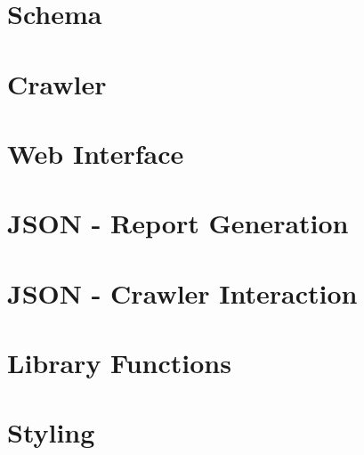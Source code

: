 \documentclass{article}
\title{\Title}
\author{\Author}
\date{\Date}
\begin{document}
\section{Schema}

\section{Crawler}


\section{Web Interface}



\section{JSON - Report Generation}



\section{JSON - Crawler Interaction}

\section{Library Functions}



\section{Styling}


\end{document}
